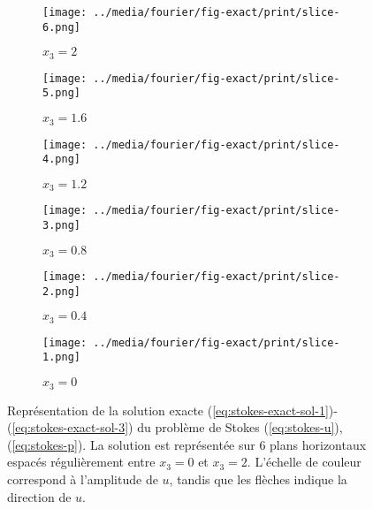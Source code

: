 \begin{figure}[t]
  \begin{center}
    \begin{subfigure}[b]{0.49\textwidth}
      \texttt{[image: ../media/fourier/fig-exact/print/slice-6.png]}
      \caption{$x_3 = 2$}
    \end{subfigure}
    \begin{subfigure}[b]{0.49\textwidth}
      \texttt{[image: ../media/fourier/fig-exact/print/slice-5.png]}
      \caption{$x_3 = 1.6$}
    \end{subfigure}
    \begin{subfigure}[b]{0.49\textwidth}
      \texttt{[image: ../media/fourier/fig-exact/print/slice-4.png]}
      \caption{$x_3 = 1.2$}
    \end{subfigure}
    \begin{subfigure}[b]{0.49\textwidth}
      \texttt{[image: ../media/fourier/fig-exact/print/slice-3.png]}
      \caption{$x_3 = 0.8$}
    \end{subfigure}
    \begin{subfigure}[b]{0.49\textwidth}
      \texttt{[image: ../media/fourier/fig-exact/print/slice-2.png]}
      \caption{$x_3 = 0.4$}
    \end{subfigure}
    \begin{subfigure}[b]{0.49\textwidth}
      \texttt{[image: ../media/fourier/fig-exact/print/slice-1.png]}
      \caption{$x_3 = 0$}
    \end{subfigure}
    \caption{Représentation de la solution exacte
      (\ref{eq:stokes-exact-sol-1})-(\ref{eq:stokes-exact-sol-3}) du
      problème de Stokes (\ref{eq:stokes-u}), (\ref{eq:stokes-p}). La
      solution est représentée sur 6 plans horizontaux espacés
      régulièrement entre $x_3 = 0$ et $x_3 = 2$. L'échelle de couleur
      correspond à l'amplitude de $u$, tandis que les flèches indique
      la direction de $u$.}
    \label{fig:stokes-exact-sol}
  \end{center}
\end{figure}

